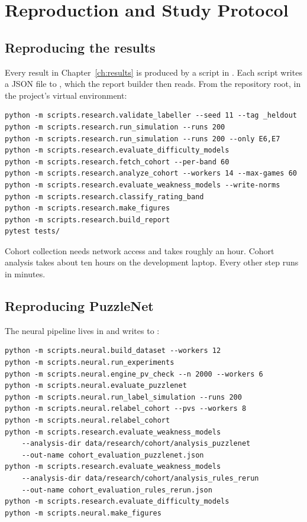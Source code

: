 \chapter{Reproduction and Study Protocol}\label{app:repro}

\section{Reproducing the results}

Every result in Chapter~\ref{ch:results} is produced by a script in . Each
script writes a JSON file to , which the report builder then reads. From the
repository root, in the project's virtual environment:

\begin{verbatim}
python -m scripts.research.validate_labeller --seed 11 --tag _heldout
python -m scripts.research.run_simulation --runs 200
python -m scripts.research.run_simulation --runs 200 --only E6,E7
python -m scripts.research.evaluate_difficulty_models
python -m scripts.research.fetch_cohort --per-band 60
python -m scripts.research.analyze_cohort --workers 14 --max-games 60
python -m scripts.research.evaluate_weakness_models --write-norms
python -m scripts.research.classify_rating_band
python -m scripts.research.make_figures
python -m scripts.research.build_report
pytest tests/
\end{verbatim}

\noindent Cohort collection needs network access and takes roughly an hour. Cohort analysis takes
about ten hours on the development laptop. Every other step runs in minutes.

\section{Reproducing PuzzleNet}

The neural pipeline lives in  and writes to :

\begin{verbatim}
python -m scripts.neural.build_dataset --workers 12
python -m scripts.neural.run_experiments
python -m scripts.neural.engine_pv_check --n 2000 --workers 6
python -m scripts.neural.evaluate_puzzlenet
python -m scripts.neural.run_label_simulation --runs 200
python -m scripts.neural.relabel_cohort --pvs --workers 8
python -m scripts.neural.relabel_cohort
python -m scripts.research.evaluate_weakness_models
    --analysis-dir data/research/cohort/analysis_puzzlenet
    --out-name cohort_evaluation_puzzlenet.json
python -m scripts.research.evaluate_weakness_models
    --analysis-dir data/research/cohort/analysis_rules_rerun
    --out-name cohort_evaluation_rules_rerun.json
python -m scripts.research.evaluate_difficulty_models
python -m scripts.neural.make_figures
\end{verbatim}

